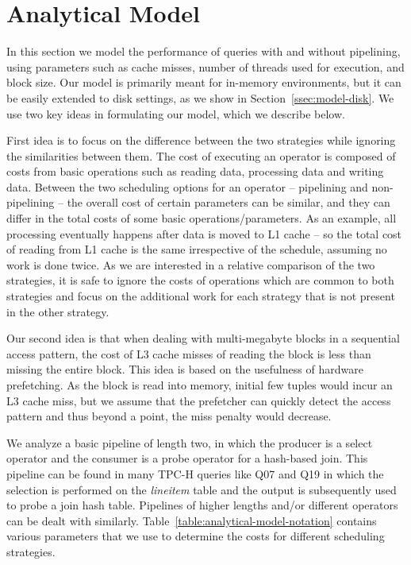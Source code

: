 \section{Analytical Model}\label{sec:model}
In this section we model the performance of queries with and without pipelining, using parameters such as cache misses, number of threads used for execution, and block size.
Our model is primarily meant for in-memory environments, but it can be easily extended to disk settings, as we show in Section~\ref{ssec:model-disk}.
We use two key ideas in formulating our model, which we describe below.

First idea is to focus on the difference between the two strategies while ignoring the similarities between them.
The cost of executing an operator is composed of costs from basic operations such as reading data, processing data and writing data. 
Between the two scheduling options for an operator -- pipelining and non-pipelining -- the overall cost of certain parameters can be similar, and they can differ in the total costs of some basic operations/parameters. 
As an example, all processing eventually happens after data is moved to L1 cache -- so the total cost of reading from L1 cache is the same irrespective of the schedule, assuming no work is done twice. 
As we are interested in a relative comparison of the two strategies, it is safe to ignore the costs of operations which are common to both strategies and focus on the additional work for each strategy that is not present in the other strategy. 

Our second idea is that when dealing with multi-megabyte blocks in a sequential access pattern, the cost of L3 cache misses of reading the block is less than missing the entire block.
This idea is based on the usefulness of hardware prefetching. 
As the block is read into memory, initial few tuples would incur an L3 cache miss, but we assume that the prefetcher can quickly detect the access pattern and thus beyond a point, the miss penalty would decrease. 

We analyze a basic pipeline of length two, in which the producer is a select operator and the consumer is a probe operator for a hash-based join. 
This pipeline can be found in many TPC-H queries like Q07 and Q19 in which the selection is performed on the \textit{lineitem} table and the output is subsequently used to probe a join hash table.
Pipelines of higher lengths and/or different operators can be dealt with similarly.
Table~\ref{table:analytical-model-notation} contains various parameters that we use to determine the costs for different scheduling strategies.

